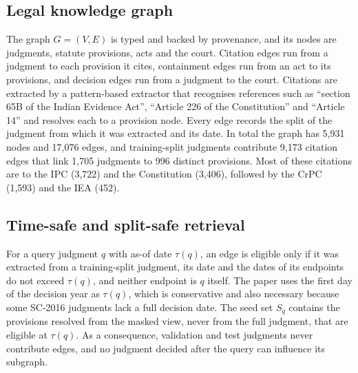 \documentclass[journal]{IEEEtran}
\begin{document}
\subsection{Legal knowledge graph}
The graph $G=(V,E)$ is typed and backed by provenance, and its nodes are judgments, statute provisions, acts and the court. Citation edges run from a judgment to each provision it cites, containment edges run from an act to its provisions, and decision edges run from a judgment to the court. Citations are extracted by a pattern-based extractor that recognises references such as ``section 65B of the Indian Evidence Act'', ``Article 226 of the Constitution'' and ``Article 14'' and resolves each to a provision node. Every edge records the split of the judgment from which it was extracted and its date. In total the graph has 5,931 nodes and 17,076 edges, and training-split judgments contribute 9,173 citation edges that link 1,705 judgments to 996 distinct provisions. Most of these citations are to the IPC (3,722) and the Constitution (3,406), followed by the CrPC (1,593) and the IEA (452).

\subsection{Time-safe and split-safe retrieval}
For a query judgment $q$ with as-of date $\tau(q)$, an edge is eligible only if it was extracted from a training-split judgment, its date and the dates of its endpoints do not exceed $\tau(q)$, and neither endpoint is $q$ itself. The paper uses the first day of the decision year as $\tau(q)$, which is conservative and also necessary because some SC-2016 judgments lack a full decision date. The seed set $S_q$ contains the provisions resolved from the masked view, never from the full judgment, that are eligible at $\tau(q)$. As a consequence, validation and test judgments never contribute edges, and no judgment decided after the query can influence its subgraph.
\end{document}
